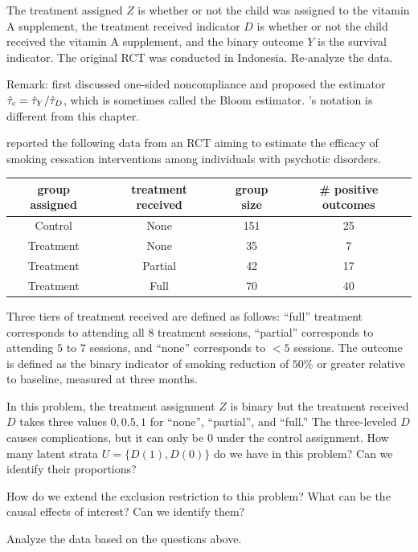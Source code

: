 \begin{HomeworkProblem}
\begin{enumerate}
The treatment assigned $Z$ is whether or not the child was assigned to the vitamin A supplement, the treatment received indicator $D$ is whether or not the child received the vitamin A supplement, and the binary outcome $Y$ is the survival indicator. The original RCT was conducted in Indonesia.
Re-analyze the data.
 \end{enumerate}


Remark: \citet{bloom1984accounting} first discussed one-sided noncompliance and proposed the estimator $\hat\tau_{\textup{c}} = \hat\tau_Y / \hat\tau_D$, which is sometimes called the Bloom estimator.  \citet{bloom1984accounting}'s notation is different from this chapter.





\end{HomeworkProblem}

\begin{HomeworkProblem}\label{exr:22-11}

\citet[][Table 3]{sanders2021incorporating} reported the following data from an RCT aiming to estimate the efficacy of smoking cessation interventions among individuals with psychotic disorders.

\begin{center}
\begin{tabular}{cccc}
\hline
group assigned& treatment received &group size& \# positive outcomes \\
\hline
Control & None& 151 &25 \\
Treatment& None& 35 & 7 \\
Treatment& Partial& 42& 17 \\
Treatment& Full& 70& 40\\
\hline
\end{tabular}
\end{center}

Three tiers of treatment received are defined as follows: ``full'' treatment corresponds to attending all $8$ treatment sessions, ``partial'' corresponds to attending $5$ to $7$ sessions, and ``none'' corresponds to $<5$ sessions. The outcome is
defined as the binary indicator of smoking reduction of $50\%$ or greater relative to baseline, measured at three months.


In this problem, the treatment assignment $Z$ is binary but the treatment received $D$ takes three values $0, 0.5, 1$ for ``none'', ``partial'', and ``full.''  The three-leveled $D$ causes complications, but it can only be 0 under the control assignment. How many latent strata $U = \{ D(1), D(0) \} $ do we have in this problem? Can we identify their proportions?

How do we extend the exclusion restriction to this problem? What can be the causal effects of interest? Can we identify them?

Analyze the data based on the questions above.





\end{HomeworkProblem}

